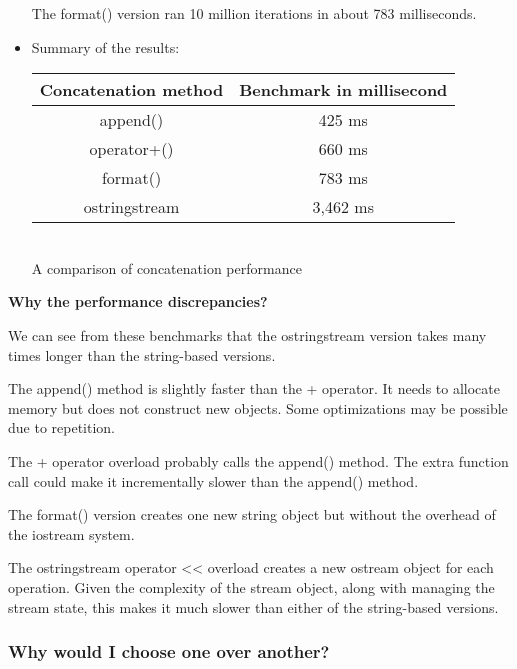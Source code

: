 \begin{itemize}
The format() version ran 10 million iterations in about 783 milliseconds.

\item 
Summary of the results:

\begin{table}[H]
\centering
\begin{tabular}{|c|c|}
	\hline
	\rowcolor[HTML]{9B9B9B} 
	{\color[HTML]{FFFFFF} Concatenation method} & {\color[HTML]{FFFFFF} Benchmark in millisecond} \\ \hline
	append()      & 425 ms   \\ \hline
	operator+()   & 660 ms   \\ \hline
	format()      & 783 ms   \\ \hline
	ostringstream & 3,462 ms \\ \hline
\end{tabular}

\hspace*{\fill} \\ %
A comparison of concatenation performance
\end{table}

\end{itemize}

\noindent
\textbf{Why the performance discrepancies?}

We can see from these benchmarks that the ostringstream version takes many times longer than the string-based versions.

The append() method is slightly faster than the + operator. It needs to allocate memory but does not construct new objects. Some optimizations may be possible due to repetition.

The + operator overload probably calls the append() method. The extra function call could make it incrementally slower than the append() method.

The format() version creates one new string object but without the overhead of the iostream system.

The ostringstream operator <{}< overload creates a new ostream object for each operation. Given the complexity of the stream object, along with managing the stream state, this makes it much slower than either of the string-based versions.

\subsubsection{Why would I choose one over another?}

